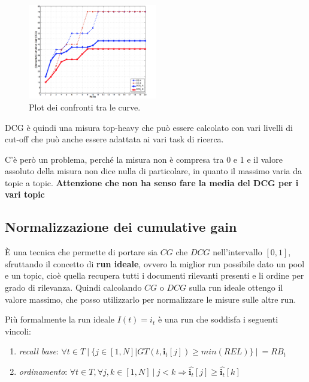\begin{figure}[htbp]
	\centering
	\includegraphics[width=0.5\textwidth]{images/l16-fig-6.png}
	\caption{Plot dei confronti tra le curve.}
\end{figure}

\noindent DCG è quindi una misura top-heavy che può essere calcolato con vari livelli di cut-off che può anche essere adattata ai vari task di ricerca.

C'è però un problema, perché la misura non è compresa tra 0 e 1 e il valore assoluto della misura non dice nulla di particolare, in quanto il massimo varia da topic a topic. \textbf{Attenzione che non ha senso fare la media del DCG per i vari topic}

\subsection{Normalizzazione dei cumulative gain}

\`E una tecnica che permette di portare sia $CG$ che $DCG$ nell'intervallo $[0,1]$, sfruttando il concetto di \textbf{run ideale}, ovvero la miglior run possibile dato un pool e un topic, cioè quella recupera tutti i documenti rilevanti presenti e li ordine per grado di rilevanza.
Quindi calcolando $CG$ o $DCG$ sulla run ideale ottengo il valore massimo, che posso utilizzarlo per normalizzare le misure sulle altre run.

Più formalmente la run ideale $I(t) = i_t$ è una run che soddisfa i seguenti vincoli:

\begin{enumerate}
	\item \textit{recall base}: $\forall t \in T\  \big | \ \{ j \in [1,N] | GT(t,\mathbf{i}_t[j]) \geq min(REL) \}\ \big | \ = RB_t$
	\item \textit{ordinamento}: $\forall t \in T, \forall j,k \in [1,N] \ | \ j < k \Rightarrow \hat{\mathbf{i}_t}[j] \geq \hat{\mathbf{i}_t}[k]$
\end{enumerate}

